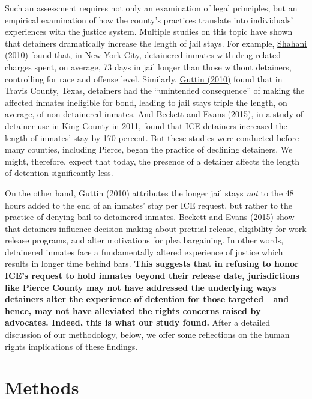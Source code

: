 \documentclass[12pt]{report}\usepackage[]{graphicx}\usepackage[]{color}
\begin{document}
Such an assessment requires not only an examination of legal principles, but an empirical examination of how the county's practices translate into individuals' experiences with the justice system. Multiple studies on this topic have shown that detainers dramatically increase the length of jail stays. For example, \href{https://immigrantjustice.org/sites/default/files/NYC%20Detainer%20Report.pdf}{Shahani (2010)} found that, in New York City, detainered inmates with drug-related charges spent, on average, 73 days in jail longer than those without detainers, controlling for race and offense level. Similarly, \href{https://repositories.lib.utexas.edu/bitstream/handle/2152/15143/ICE_TravisCounty.pdf?sequence=2}{Guttin (2010)} found that in Travis County, Texas, detainers had the ``unintended consequence'' of making the affected inmates ineligible for bond, leading to jail stays triple the length, on average, of non-detainered inmates. And \href{https://onlinelibrary.wiley.com/doi/abs/10.1111/lasr.12120}{Beckett and Evans (2015)}, in a study of detainer use in King County in 2011, found that ICE detainers increased the length of inmates' stay by 170 percent. But these studies were conducted before many counties, including Pierce, began the practice of declining detainers. We might, therefore, expect that today, the presence of a detainer affects the length of detention significantly less.

On the other hand, Guttin (2010) attributes the longer jail stays \emph{not} to the 48 hours added to the end of an inmates' stay per ICE request, but rather to the practice of denying bail to detainered inmates. Beckett and Evans (2015) show that detainers influence decision-making about pretrial release, eligibility for work release programs, and alter motivations for plea bargaining. In other words, detainered inmates face a fundamentally altered experience of justice which results in longer time behind bars. \textbf{This suggests that in refusing to honor ICE's request to hold inmates beyond their release date, jurisdictions like Pierce County may not have addressed the underlying ways detainers alter the experience of detention for those targeted---and hence, may not have alleviated the rights concerns raised by advocates. Indeed, this is what our study found.} After a detailed discussion of our methodology, below, we offer some reflections on the human rights implications of these findings.

\section*{Methods}
\end{document}
